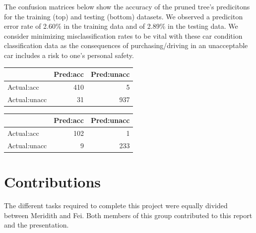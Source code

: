 \documentclass[]{article}
\begin{document}
The confusion matrices below show the accuracy of the pruned tree's
predicitons for the training (top) and testing (bottom) datasets. We
observed a prediciton error rate of 2.60\% in the training data and of
2.89\% in the testing data. We consider minimizing misclassification
rates to be vital with these car condition classification data as the
consequences of purchasing/driving in an unacceptable car includes a
risk to one's personal safety.

\begin{longtable}[]{@{}lrr@{}}
\toprule
& Pred:acc & Pred:unacc\tabularnewline
\midrule
\endhead
Actual:acc & 410 & 5\tabularnewline
Actual:unacc & 31 & 937\tabularnewline
\bottomrule
\end{longtable}

\begin{longtable}[]{@{}lrr@{}}
\toprule
& Pred:acc & Pred:unacc\tabularnewline
\midrule
\endhead
Actual:acc & 102 & 1\tabularnewline
Actual:unacc & 9 & 233\tabularnewline
\bottomrule
\end{longtable}

\section{Contributions}\label{contributions}

The different tasks required to complete this project were equally
divided between Meridith and Fei. Both members of this group contributed
to this report and the presentation.
\end{document}
